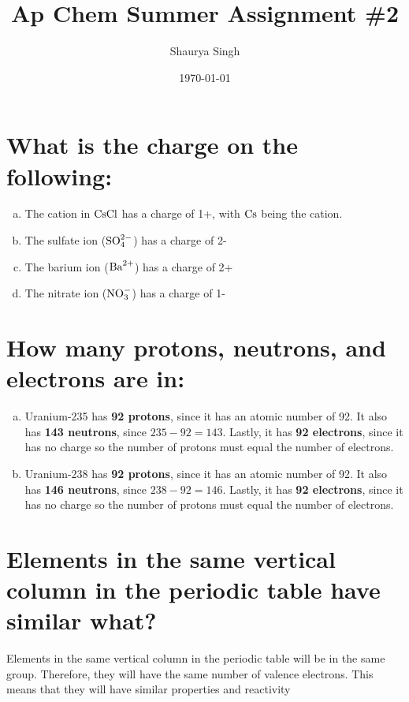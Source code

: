\documentclass[11pt]{article}
\author{Shaurya Singh}
\date{\today}
\title{Ap Chem Summer Assignment \#2}
\begin{document}
\maketitle

\section{What is the charge on the following:}
\label{sec:orgc95d17e}
\begin{enumerate}[(a)]
\item The cation in \(\ce{CsCl}\) has a charge of 1+, with \(\ce{Cs}\) being the cation.
\item The sulfate ion (\(\ce{SO^{2-}4}\)) has a charge of 2-
\item The barium ion (\(\ce{Ba^{2+}}\)) has a charge of 2+
\item The nitrate ion (\(\ce{NO^-3}\)) has a charge of 1-
\end{enumerate}

\section{How many protons, neutrons, and electrons are in:}
\label{sec:orgd498246}
\begin{enumerate}[(a)]
\item Uranium-235 has \textbf{92 protons}, since it has an atomic number of 92. It also has \textbf{143 neutrons}, since \(235-92=143\). Lastly, it has \textbf{92 electrons}, since it has no charge so the number of protons must equal the number of electrons.
\item Uranium-238 has \textbf{92 protons}, since it has an atomic number of 92. It also has \textbf{146 neutrons}, since \(238-92=146\). Lastly, it has \textbf{92 electrons}, since it has no charge so the number of protons must equal the number of electrons.
\end{enumerate}

\section{Elements in the same vertical column in the periodic table have similar what?}
\label{sec:orgb1d0500}
Elements in the same vertical column in the periodic table will be in the same
group. Therefore, they will have the same number of valence electrons. This
means that they will have similar properties and reactivity
\end{document}
